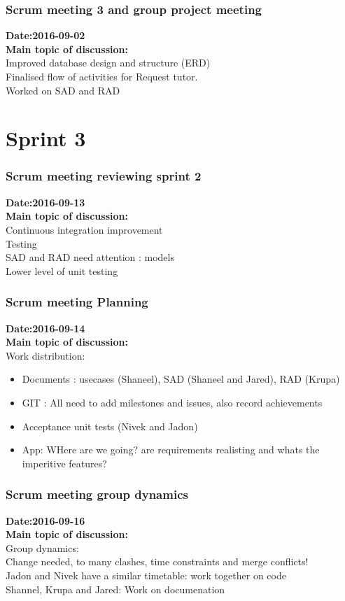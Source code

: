 \documentclass[12pt]{article}
\begin{document}
{\subsubsection{Scrum meeting 3 and group project meeting}
\textbf{Date:2016-09-02}\\
\textbf{Main topic of discussion:}\\
Improved database design and structure (ERD)\\
Finalised flow of activities for Request tutor.\\
Worked on SAD and RAD
\section{Sprint 3}
\subsubsection{Scrum meeting reviewing sprint 2}
\textbf{Date:2016-09-13}\\
\textbf{Main topic of discussion:}\\
Continuous integration improvement\\
Testing\\
SAD and RAD need attention : models \\
Lower level of unit testing

\subsubsection{Scrum meeting Planning}
\textbf{Date:2016-09-14}\\
\textbf{Main topic of discussion:}\\
Work distribution:
\begin{itemize}
\item Documents : usecases (Shaneel), SAD (Shaneel and Jared), RAD (Krupa)
\item GIT : All need to add milestones and issues, also record achievements
\item Acceptance unit tests (Nivek and Jadon)
\item App: WHere are we going? are requirements realisting and whats the imperitive features?
\end{itemize}

\subsubsection{Scrum meeting group dynamics}
\textbf{Date:2016-09-16}\\
\textbf{Main topic of discussion:}\\
Group dynamics:\\
Change needed, to many clashes, time constraints and merge conflicts!\\
Jadon and Nivek have a similar timetable: work together on code\\
Shannel, Krupa and Jared: Work on documenation \\


}
\end{document}
